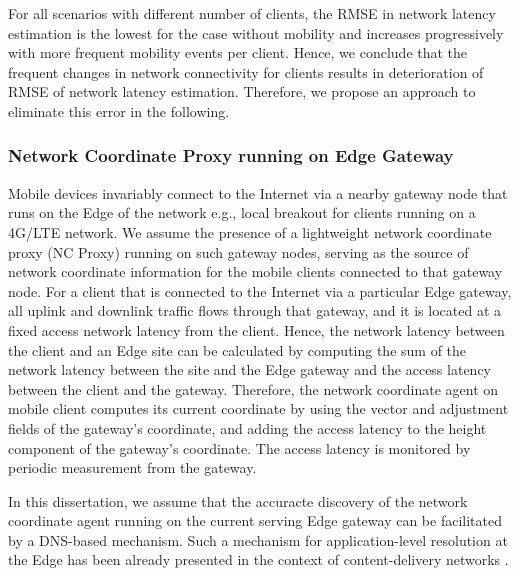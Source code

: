 For all scenarios with different number of clients, the RMSE in network latency estimation is the lowest for the case without mobility and increases progressively with more frequent mobility events per client. Hence, we conclude that the frequent changes in network connectivity for clients results in deterioration of RMSE of network latency estimation. Therefore, we propose an approach to eliminate this error in the following.

\subsubsection{Network Coordinate Proxy running on Edge Gateway}
Mobile devices invariably connect to the Internet via a nearby gateway node that runs on the Edge of the network e.g., local breakout \cite{localbreakout} for clients running on a 4G/LTE network. We assume the presence of a lightweight network coordinate proxy (NC Proxy) running on such gateway nodes, serving as the source of network coordinate information for the mobile clients connected to that gateway node. For a client that is connected to the Internet via a particular Edge gateway, all uplink and downlink traffic flows through that gateway, and it is located at a fixed access network latency from the client. Hence, the network latency between the client and an Edge site can be calculated by computing the sum of the network latency between the site and the Edge gateway and the access latency between the client and the gateway. Therefore, the network coordinate agent on mobile client computes its current coordinate by using the vector and adjustment fields of the gateway's coordinate, and adding the access latency to the height component of the gateway's coordinate. The access latency is monitored by periodic measurement from the gateway.
\par In this dissertation, we assume that the accuracte discovery of the network coordinate agent running on the current serving Edge gateway can be facilitated by a DNS-based mechanism. Such a mechanism for application-level resolution at the Edge has been already presented in the context of content-delivery networks \cite{hsu2020dns}. 

